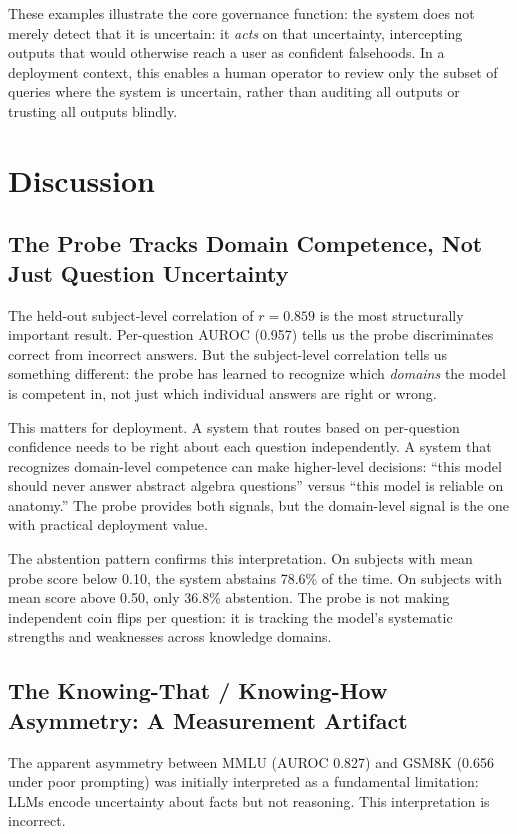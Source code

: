 \documentclass{article}
\begin{document}
These examples illustrate the core governance function: the system does not merely detect that it is uncertain: it \emph{acts} on that uncertainty, intercepting outputs that would otherwise reach a user as confident falsehoods. In a deployment context, this enables a human operator to review only the subset of queries where the system is uncertain, rather than auditing all outputs or trusting all outputs blindly.

\section{Discussion}

\subsection{The Probe Tracks Domain Competence, Not Just Question Uncertainty}

The held-out subject-level correlation of $r=0.859$ is the most structurally important result. Per-question AUROC (0.957) tells us the probe discriminates correct from incorrect answers. But the subject-level correlation tells us something different: the probe has learned to recognize which \emph{domains} the model is competent in, not just which individual answers are right or wrong.

This matters for deployment. A system that routes based on per-question confidence needs to be right about each question independently. A system that recognizes domain-level competence can make higher-level decisions: ``this model should never answer abstract algebra questions'' versus ``this model is reliable on anatomy.'' The probe provides both signals, but the domain-level signal is the one with practical deployment value.

The abstention pattern confirms this interpretation. On subjects with mean probe score below 0.10, the system abstains 78.6\% of the time. On subjects with mean score above 0.50, only 36.8\% abstention. The probe is not making independent coin flips per question: it is tracking the model's systematic strengths and weaknesses across knowledge domains.

\subsection{The Knowing-That / Knowing-How Asymmetry: A Measurement Artifact}

The apparent asymmetry between MMLU (AUROC 0.827) and GSM8K (0.656 under poor prompting) was initially interpreted as a fundamental limitation: LLMs encode uncertainty about facts but not reasoning. This interpretation is incorrect.
\end{document}
